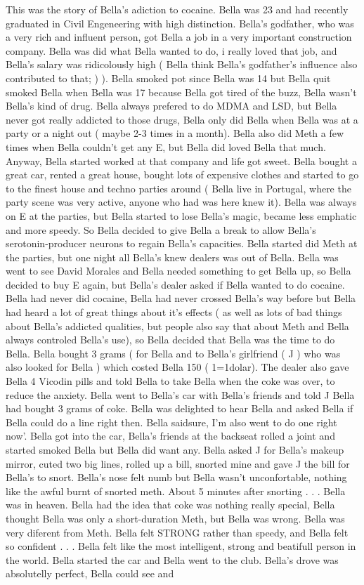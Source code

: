 \documentclass[12pt]{book}
\begin{document}
This was the story of Bella's adiction to cocaine. Bella was 23 and had recently graduated in Civil Engeneering with high distinction. Bella's godfather, who was a very rich and influent person, got Bella a job in a very important construction company. Bella was did what Bella wanted to do, i really loved that job, and Bella's salary was ridicolously high ( Bella think Bella's godfather's influence also contributed to that; ) ). Bella smoked pot since Bella was 14 but Bella quit smoked Bella when Bella was 17 because Bella got tired of the buzz, Bella wasn't Bella's kind of drug. Bella always prefered to do MDMA and LSD, but Bella never got really addicted to those drugs, Bella only did Bella when Bella was at a party or a night out ( maybe 2-3 times in a month). Bella also did Meth a few times when Bella couldn't get any E, but Bella did loved Bella that much. Anyway, Bella started worked at that company and life got sweet. Bella bought a great car, rented a great house, bought lots of expensive clothes and started to go to the finest house and techno parties around ( Bella live in Portugal, where the party scene was very active, anyone who had was here knew it). Bella was always on E at the parties, but Bella started to lose Bella's magic, became less emphatic and more speedy. So Bella decided to give Bella a break to allow Bella's serotonin-producer neurons to regain Bella's capacities. Bella started did Meth at the parties, but one night all Bella's knew dealers was out of Bella. Bella was went to see David Morales and Bella needed something to get Bella up, so Bella decided to buy E again, but Bella's dealer asked if Bella wanted to do cocaine. Bella had never did cocaine, Bella had never crossed Bella's way before but Bella had heard a lot of great things about it's effects ( as well as lots of bad things about Bella's addicted qualities, but people also say that about Meth and Bella always controled Bella's use), so Bella decided that Bella was the time to do Bella. Bella bought 3 grams ( for Bella and to Bella's girlfriend ( J ) who was also looked for Bella ) which costed Bella 150 ( 1=1dolar). The dealer also gave Bella 4 Vicodin pills and told Bella to take Bella when the coke was over, to reduce the anxiety. Bella went to Bella's car with Bella's friends and told J Bella had bought 3 grams of coke. Bella was delighted to hear Bella and asked Bella if Bella could do a line right then. Bella saidsure, I'm also went to do one right now'. Bella got into the car, Bella's friends at the backseat rolled a joint and started smoked Bella but Bella did want any. Bella asked J for Bella's makeup mirror, cuted two big lines, rolled up a bill, snorted mine and gave J the bill for Bella's to snort. Bella's nose felt numb but Bella wasn't unconfortable, nothing like the awful burnt of snorted meth. About 5 minutes after snorting . . .  Bella was in heaven. Bella had the idea that coke was nothing really special, Bella thought Bella was only a short-duration Meth, but Bella was wrong. Bella was very diferent from Meth. Bella felt STRONG rather than speedy, and Bella felt so confident . . .  Bella felt like the most intelligent, strong and beatifull person in the world. Bella started the car and Bella went to the club. Bella's drove was absolutelly perfect, Bella could see and 
\end{document}
